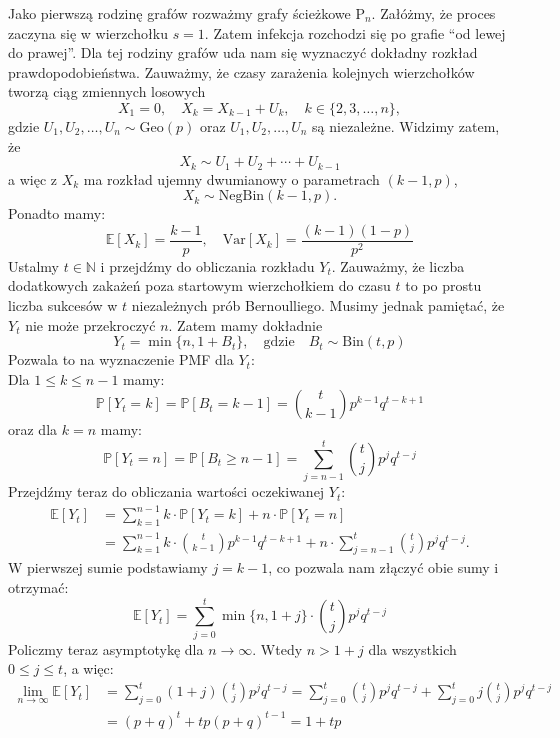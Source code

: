 Jako pierwszą rodzinę grafów rozważmy grafy ścieżkowe $\mathrm{P}_n$. Załóżmy, że proces zaczyna się w wierzchołku $s=1$. Zatem infekcja rozchodzi się po grafie ``od lewej do prawej''. Dla tej rodziny grafów uda nam się wyznaczyć dokładny rozkład prawdopodobieństwa. Zauważmy, że czasy zarażenia kolejnych wierzchołków tworzą ciąg zmiennych losowych
\[
X_1 = 0, \quad X_{k} = X_{k-1} + U_k, \quad k\in\{2,3,\dots,n\},
\]
gdzie $U_1,U_2,\dots,U_n \sim \mathrm{Geo}(p)$ oraz $U_1,U_2,\dots,U_n$ są niezależne. 
Widzimy zatem, że
\[
X_k \sim U_1 + U_2 + \cdots + U_{k-1}
\]
a więc z  $X_k$ ma rozkład ujemny dwumianowy o parametrach $(k-1, p)$, 
\[
X_k\sim \mathrm{NegBin}(k-1, p).
\]
Ponadto mamy:
\[
    \mathbb{E}[X_k] = \frac{k-1}{p}, \quad \mathrm{Var}[X_k] = \frac{(k-1)(1-p)}{p^2}
\]
Ustalmy $t\in\mathbb{N}$ i przejdźmy do obliczania rozkładu $Y_t$. Zauważmy, że liczba dodatkowych zakażeń poza startowym wierzchołkiem do czasu $t$ to po prostu liczba sukcesów w $t$ niezależnych prób Bernoulliego. Musimy jednak pamiętać, że $Y_t$ nie może przekroczyć $n$. Zatem mamy dokładnie
\[
Y_t = \min\{n, 1 + B_t\}, \quad \text{gdzie} \quad B_t \sim \mathrm{Bin}(t,p)
\]
Pozwala to na wyznaczenie PMF dla $Y_t$: \\
Dla $1 \le k \le n-1$ mamy:
\[
\mathbb{P}[Y_t=k] = \mathbb{P}[B_t=k-1] = \binom{t}{k-1} p^{k-1} q^{t-k+1}
\]  
oraz dla $k = n$ mamy:
\[
\mathbb{P}[Y_t=n] = \mathbb{P}[B_t \ge n-1] = \sum_{j=n-1}^{t} \binom{t}{j} p^j q^{t-j}
\]
Przejdźmy teraz do obliczania wartości oczekiwanej $Y_t$:
\begin{equation*}
\begin{aligned}
\mathbb{E}[Y_t] 
&= \sum_{k=1}^{n-1} k \cdot \mathbb{P}[Y_t=k] + n \cdot \mathbb{P}[Y_t=n] \\
&= \sum_{k=1}^{n-1} k \cdot \binom{t}{k-1} p^{k-1} q^{t-k+1} 
   + n \cdot \sum_{j=n-1}^{t} \binom{t}{j} p^j q^{t-j}.
\end{aligned}
\end{equation*}
W pierwszej sumie podstawiamy $j = k-1$, co pozwala nam złączyć obie sumy i otrzymać:
\[
    \mathbb{E}[Y_t] = \sum_{j=0}^{t} \min\{n, 1+j\} \cdot \binom{t}{j} p^j q^{t-j}
\]
Policzmy teraz asymptotykę dla $n \to \infty$. Wtedy $n > 1 + j$ dla wszystkich $0 \le j \le t$, a więc:
\begin{equation*}
\begin{aligned}
\lim_{n \to \infty} \mathbb{E}[Y_t] 
    &= \sum_{j=0}^{t} (1+j)\binom{t}{j} p^j q^{t-j} = \sum_{j=0}^{t} \binom{t}{j} p^j q^{t-j} 
       + \sum_{j=0}^{t} j \binom{t}{j} p^j q^{t-j} \\
    &= (p+q)^t + t p (p+q)^{t-1} = 1 + t p 
\end{aligned}
\end{equation*}
